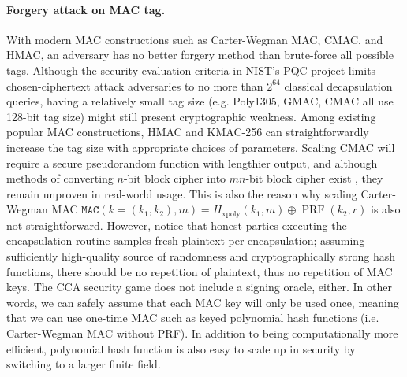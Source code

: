 \documentclass[runningheads]{llncs}
\newcommand{\mac}{\texttt{MAC}}
\begin{document}
\paragraph{Forgery attack on MAC tag.} With modern MAC constructions such as Carter-Wegman MAC, CMAC, and HMAC, an adversary has no better forgery method than brute-force all possible tags. Although the security evaluation criteria in NIST's PQC project limits chosen-ciphertext attack adversaries to no more than $2^{64}$ classical decapsulation queries, having a relatively small tag size (e.g. Poly1305, GMAC, CMAC all use 128-bit tag size) might still present cryptographic weakness. Among existing popular MAC constructions, HMAC and KMAC-256 can straightforwardly increase the tag size with appropriate choices of parameters. Scaling CMAC will require a secure pseudorandom function with lengthier output, and although methods of converting $n$-bit block cipher into $mn$-bit block cipher exist \cite{DBLP:conf/ctrsa/HaleviR04}, they remain unproven in real-world usage. This is also the reason why scaling Carter-Wegman MAC $\mac(k=(k_1, k_2), m) = H_\text{xpoly}(k_1, m) \oplus \operatorname{PRF}(k_2, r)$ is also not straightforward. However, notice that honest parties executing the encapsulation routine samples fresh plaintext per encapsulation; assuming sufficiently high-quality source of randomness and cryptographically strong hash functions, there should be no repetition of plaintext, thus no repetition of MAC keys. The CCA security game does not include a signing oracle, either. In other words, we can safely assume that each MAC key will only be used once, meaning that we can use one-time MAC such as keyed polynomial hash functions (i.e. Carter-Wegman MAC without PRF). In addition to being computationally more efficient, polynomial hash function is also easy to scale up in security by switching to a larger finite field.

\end{document}
